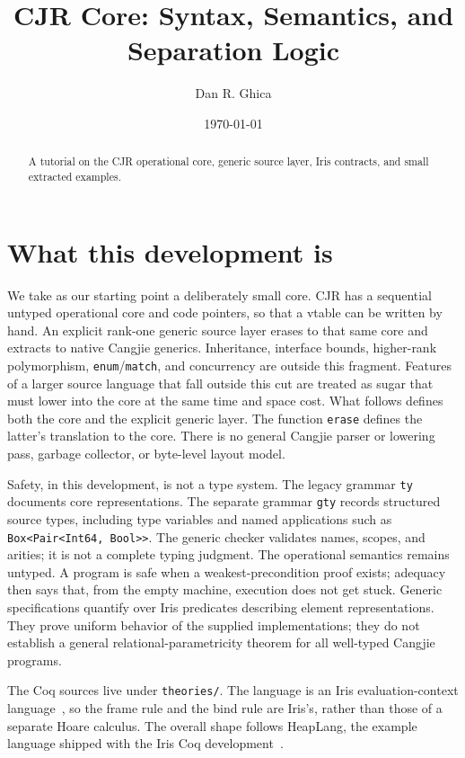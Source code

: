\documentclass[11pt]{article}
\title{CJR Core: Syntax, Semantics, and Separation Logic}
\author{Dan R. Ghica}
\date{\today}
\newcommand{\cjr}{CJR}
\begin{document}
\maketitle

\begin{abstract}A tutorial on the CJR operational core, generic source layer, Iris contracts, and small extracted examples.\end{abstract}

\clearpage
\tableofcontents
\clearpage

\section{What this development is}

We take as our starting point a deliberately small core.
\cjr{} has a sequential untyped operational core and code pointers, so that a vtable can be written by hand.
An explicit rank-one generic source layer erases to that same core and extracts to native Cangjie generics.
Inheritance, interface bounds, higher-rank polymorphism, \texttt{enum}/\texttt{match}, and concurrency are outside this fragment.
Features of a larger source language that fall outside this cut are treated as sugar that must lower into the core at the same time and space cost.
What follows defines both the core and the explicit generic layer.
The function \texttt{erase} defines the latter's translation to the core.
There is no general Cangjie parser or lowering pass, garbage collector,
or byte-level layout model.

Safety, in this development, is not a type system.
The legacy grammar \texttt{ty} documents core representations. The separate
grammar \texttt{gty} records structured source types, including type variables
and named applications such as \texttt{Box<Pair<Int64, Bool>>}.
The generic checker validates names, scopes, and arities; it is not a complete
typing judgment. The operational semantics remains untyped.
A program is safe when a weakest-precondition proof exists; adequacy then says that, from the empty machine, execution does not get stuck.
Generic specifications quantify over Iris predicates describing element
representations. They prove uniform behavior of the supplied implementations;
they do not establish a general relational-parametricity theorem for all
well-typed Cangjie programs.

The Coq sources live under \texttt{theories/}.
The language is an Iris evaluation-context language~\cite{iris-ground-up,iris-essence}, so the frame rule and the bind rule are Iris's, rather than those of a separate Hoare calculus.
The overall shape follows HeapLang, the example language shipped with the Iris Coq development~\cite{iris-coq}.
\end{document}
